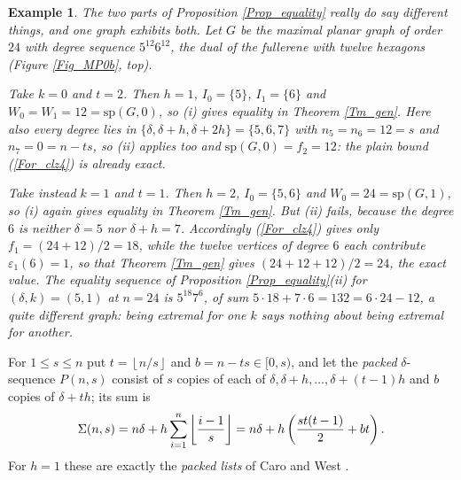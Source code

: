 \documentclass[12pt,a4paper]{article}%
\newtheorem{example}[theorem]{Example}
\begin{document}
\begin{example}
\label{Ex_equality}The two parts of Proposition \ref{Prop_equality} really do
say different things, and one graph exhibits both. Let $G$ be the maximal planar graph
of order $24$ with degree sequence $5^{12}6^{12}$, the dual of the fullerene
with twelve hexagons (Figure \ref{Fig_MP0b}, top).

Take $k=0$ and $t=2$. Then $h=1$, $I_{0}=\{5\}$, $I_{1}=\{6\}$ and
$W_{0}=W_{1}=12=\mathrm{sp}(G,0)$, so (i) gives equality in Theorem
\ref{Tm_gen}. Here also every degree lies in
$\{\delta ,\delta +h,\delta +2h\}=\{5,6,7\}$ with $n_{5}=n_{6}=12=s$ and
$n_{7}=0=n-ts$, so (ii) applies too and $\mathrm{sp}(G,0)=f_{2}=12$: the plain
bound (\ref{For_clz4}) is already exact.

Take instead $k=1$ and $t=1$. Then $h=2$, $I_{0}=\{5,6\}$ and
$W_{0}=24=\mathrm{sp}(G,1)$, so (i) again gives equality in Theorem
\ref{Tm_gen}. But (ii) fails, because the degree $6$ is neither $\delta =5$ nor
$\delta +h=7$. Accordingly (\ref{For_clz4}) gives only $f_{1}=(24+12)/2=18$,
while the twelve vertices of degree $6$ each contribute
$\varepsilon _{1}(6)=1$, so that Theorem \ref{Tm_gen} gives $(24+12+12)/2=24$,
the exact value. The equality sequence of Proposition \ref{Prop_equality}(ii)
for $(\delta ,k)=(5,1)$ at $n=24$ is $5^{18}7^{6}$, of sum
$5\cdot 18+7\cdot 6=132=6\cdot 24-12$, a quite different graph: being extremal
for one $k$ says nothing about being extremal for another.
\end{example}



For $1\leq s\leq n$ put $t=\left\lfloor n/s\right\rfloor $ and $b=n-ts\in \lbrack 0,s)$, and let
the \emph{packed} $\delta $-sequence $P(n,s)$ consist of $s$ copies of each of $\delta ,\delta
+h,\ldots ,\delta +(t-1)h$ and $b$ copies of $\delta +th$; its sum is
\[
\Sigma (n,s)=n\delta +h\sum_{i=1}^{n}\left\lfloor \frac{i-1}{s}\right\rfloor =n\delta +h\left( \frac{%
st(t-1)}{2}+bt\right) .
\]
For $h=1$ these are exactly the \emph{packed lists} of Caro and West \cite{CaroWest}.
\end{document}
